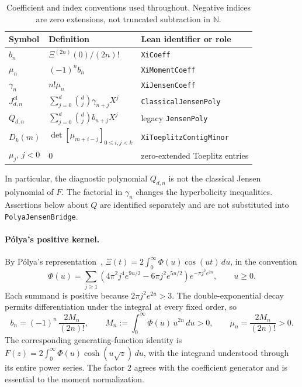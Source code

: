 \documentclass[11pt]{article}
\newcommand{\code}[1]{\ifmmode\text{\nolinkurl{#1}}\else\nolinkurl{#1}\fi}
\theoremstyle{plain}
\theoremstyle{definition}
\theoremstyle{remark}
\newcommand{\N}{\mathbb{N}}
\newcommand{\Xib}{\Xi}
\begin{document}
\begin{table}[htbp]\centering\small
\caption{Coefficient and index conventions used throughout. Negative indices
are zero extensions, not truncated subtraction in $\N$.}\label{tab:notation}
\begin{tabular}{@{}lll@{}}\toprule
Symbol & Definition & Lean identifier or role\\\midrule
$b_n$ & $\Xib^{(2n)}(0)/(2n)!$ & \code{XiCoeff}\\
$\mu_n$ & $(-1)^n b_n$ & \code{XiMomentCoeff}\\
$\gamma_n$ & $n!\mu_n$ & \code{XiJensenCoeff}\\
$J^{\mathrm{cl}}_{d,n}$ & $\sum_{j=0}^d\binom dj\gamma_{n+j}X^j$ & \code{ClassicalJensenPoly}\\
$Q_{d,n}$ & $\sum_{j=0}^d\binom dj b_{n+j}X^j$ & legacy \code{JensenPoly}\\
$D_k(m)$ & $\det[\mu_{m+i-j}]_{0\le i,j<k}$ & \code{XiToeplitzContigMinor}\\
$\mu_j$, $j<0$ & $0$ & zero-extended Toeplitz entries\\\bottomrule
\end{tabular}
\end{table}

In particular, the diagnostic polynomial $Q_{d,n}$ is not the classical
Jensen polynomial of $F$. The factorial in $\gamma_n$ changes the
hyperbolicity inequalities. Assertions below about $Q$ are identified
separately and are not substituted into \code{PolyaJensenBridge}.

\paragraph{Pólya's positive kernel.} By Pólya's representation~\cite{Polya1926},
$\Xib(t) = 2\int_0^\infty \Phi(u)\cos(ut)\,du$, in the convention
\begin{equation}\label{eq:kernel}
 \Phi(u)=\sum_{j\ge1}\left(4\pi^2j^4e^{9u/2}-6\pi j^2e^{5u/2}\right)
               e^{-\pi j^2e^{2u}},\qquad u\ge0.
\end{equation}
Each summand is positive because $2\pi j^2e^{2u}>3$. The double-exponential
decay permits differentiation under the integral at every fixed order, so
\begin{equation}\label{eq:moments}
  b_n = (-1)^n\,\frac{2 M_n}{(2n)!},\qquad
  M_n := \int_0^\infty \Phi(u)\,u^{2n}\,du > 0,
  \qquad \mu_n = \frac{2 M_n}{(2n)!} > 0 .
\end{equation}
The corresponding generating-function identity is
$F(z)=2\int_0^\infty\Phi(u)\cosh(u\sqrt z)\,du$, with the integrand
understood through its entire power series. The factor $2$ agrees with
the coefficient generator and is essential to the moment normalization.
\end{document}
